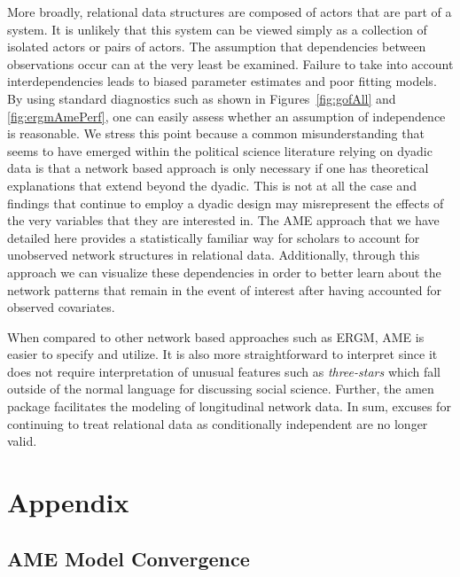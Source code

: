 \documentclass[12pt,onesided,pdflatex]{amsart}
\newcommand{\pkg}[1]{{\fontseries{b}\selectfont #1}}
\begin{document}
More broadly, relational data structures are composed of actors that are part of a system. It is unlikely that this system can be viewed simply as a collection of isolated actors or pairs of actors. The assumption  that dependencies between observations occur can at the very least be examined. Failure to take into account interdependencies leads to biased parameter estimates and poor fitting models. By using standard diagnostics such as shown in  Figures~\ref{fig:gofAll} and \ref{fig:ergmAmePerf}, one can easily assess whether an assumption of independence is reasonable. We stress this point because a common misunderstanding that seems to have emerged within the political science literature relying on dyadic data is that a network based approach is only necessary if one has theoretical explanations that extend beyond the dyadic. This is not at all the case and findings that continue to employ a dyadic design may misrepresent the effects of the very variables that they are interested in. The AME approach that we have detailed here provides a statistically familiar way for scholars to account for unobserved network structures in relational data. Additionally, through this approach we can visualize these dependencies in order to better learn about the network patterns that remain in the event of interest after having accounted for observed covariates.  

When compared to other network based approaches such as ERGM, AME is easier to specify and utilize. It is also more straightforward to interpret since it does not require interpretation of unusual features such as \textit{three-stars} which fall outside of the normal language for discussing social science. Further, the \pkg{amen} package facilitates the modeling of longitudinal network data. In sum, excuses for continuing to treat relational data as conditionally independent are no longer valid. 

\clearpage

\renewcommand{\thefigure}{A\arabic{figure}}
\setcounter{figure}{0}
\renewcommand{\thetable}{A.\arabic{table}}
\setcounter{table}{0}
\renewcommand{\thesection}{A.\arabic{section}}
\setcounter{section}{0}

\section{\textbf{Appendix}}

\subsection{AME Model Convergence}
\label{sec:ameConvAppendix}
\end{document}
